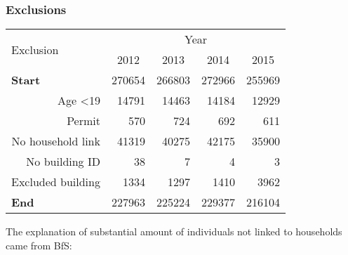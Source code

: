 \documentclass[a4paper, notitlepage, fleqn]{article} %
\begin{document}
\newpage
\subsubsection{Exclusions}

\begin{table}[!htbp]
\centering
\begin{tabular}{rrrrr}
\hline
\multicolumn{1}{l}{\multirow{2}{*}{Exclusion}} & \multicolumn{4}{c}{Year}                                                                                  \\
\multicolumn{1}{l}{}                           & \multicolumn{1}{c}{2012} & \multicolumn{1}{c}{2013} & \multicolumn{1}{c}{2014} & \multicolumn{1}{c}{2015} \\
\hline
\multicolumn{1}{l}{\textbf{Start}}             & 270654               & 266803               & 272966               & 255969               \\
\quad Age \textless 19				           & 14791                 & 14463                 & 14184                 & 12929                 \\
\quad Permit      					           & 570                 & 724                 & 692                 & 611                 \\
\quad No household link				           & 41319                 & 40275                 & 42175                 & 35900                 \\
\quad No building ID 					       & 38                 & 7                 & 4                 & 3                 \\
\quad Excluded building 				       & 1334                 & 1297                 & 1410                 & 3962                 \\
\hline
\multicolumn{1}{l}{\textbf{End}}               & 227963                 & 225224                 & 229377                 & 216104                 \\
\hline
\end{tabular}
\end{table}

The explanation of substantial amount of individuals not linked to households came from BfS:  
\end{document}
